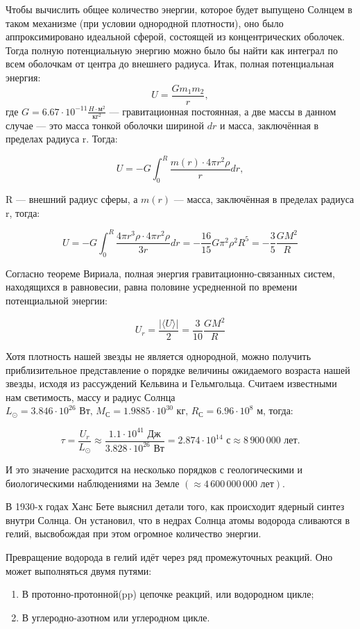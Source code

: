 \documentclass[a4paper,12pt]{article}
\begin{document}
 Чтобы вычислить общее количество энергии, которое будет выпущено Солнцем в таком механизме (при условии однородной плотности), оно было аппроксимировано идеальной сферой, состоящей из концентрических оболочек. Тогда полную потенциальную энергию можно было бы найти как интеграл по всем оболочкам от центра до внешнего радиуса. Итак, полная потенциальная энергия:
 \[
 U = \frac{Gm_1m_2}{r},
 \]
где $G = 6.67 \cdot 10^{-11} \frac{H \cdot \text{м}^2}{\text{кг}^2}$ --- гравитационная постоянная, а две массы в данном случае --- это масса тонкой оболочки шириной $dr$ и масса, заключённая в пределах радиуса r. Тогда:

\[
U = -G\int_0^R\frac{m(r)\cdot 4\pi r^2\rho}{r}dr, 
\]

 R --- внешний радиус сферы, а $m(r)$ --- масса, заключённая в пределах радиуса r, тогда:

\[
U = -G\int_0^R\frac{4\pi r^3\rho\cdot 4\pi r^2\rho}{3r}dr = -\frac{16}{15}G\pi^2\rho^2R^5 = -\frac{3}{5}\frac{G M^2}{R}
\]


Согласно теореме Вириала, полная энергия гравитационно-связанных систем, находящихся в равновесии, равна половине усредненной по времени потенциальной энергии: 

\[
U_r = \frac{|\langle U \rangle|}{2} = \frac{3}{10}\frac{G M^2}{R}
\]

Хотя плотность нашей звезды не является однородной, можно получить приблизительное представление о порядке величины ожидаемого возраста нашей звезды, исходя из рассуждений Кельвина и Гельмгольца. Считаем известными нам светимость, массу и радиус Солнца\\ $L_\odot = 3.846 \cdot 10^{26} \text{ Вт, } M_{\text{С}} = 1.9885 \cdot 10^{30} \text{ кг, } R_{\text{С}} = 6.96 \cdot 10^8 \text{ м}$, тогда:

\[
\tau = \frac{U_r}{L_\odot} \approx \frac{1.1\cdot 10^{41} \text{ Дж}}{3.828\cdot 10^{26} \text{ Вт}} = 2.874 \cdot 10^{14} \text{ с} \approx 8\,900\,000 \text{ лет}.
\]

И это значение расходится на несколько порядков с геологическими и биологическими наблюдениями на Земле $(\approx 4\,600\,000\,000 \text{ лет})$.

В 1930-х годах Ханс Бете выяснил детали того, как происходит ядерный синтез внутри Солнца. Он установил, что в недрах Солнца атомы водорода сливаются в гелий, высвобождая при этом огромное количество энергии. 

Превращение водорода в гелий идёт через ряд промежуточных реакций. Оно может выполняться двумя путями:
\begin{enumerate}
\item В протонно-протонной(pp) цепочке реакций, или водородном цикле;
\item В углеродно-азотном или углеродном цикле.
\end{enumerate}
\end{document}
